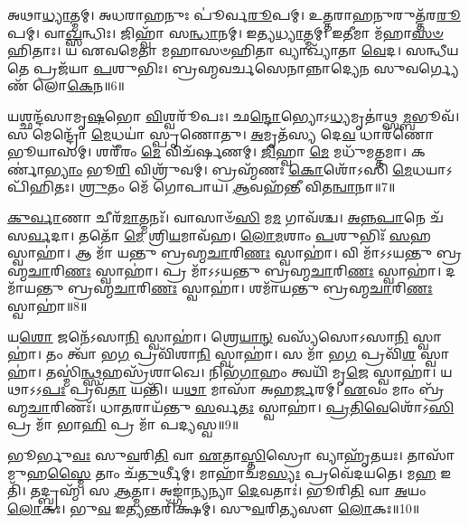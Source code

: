 𑌅𑌥𑌾\-\ul{𑌧𑍍𑌯𑌾}\-𑌤𑍍𑌮𑌮𑍍। 
𑌅𑌧𑌰𑌾𑌹𑌨𑍁𑌃 𑌪𑍂॑𑌰𑍍𑌵\-\-\ul{𑌰𑍂}\-𑌪𑌮𑍍। 
𑌉𑌤𑍍𑌤𑌰𑌾𑌹𑌨𑍁𑌰𑍁𑌤𑍍𑌤᳴𑌰\-\-\ul{𑌰𑍂}\-𑌪𑌮𑍍। 
𑌵𑌾\-\ul{𑌖𑍍𑌸}\-𑌨𑍍𑌧𑌿𑌃। 
𑌜𑌿𑌹𑍍𑌵𑌾᳴ 𑌸\-\ul{𑌨𑍍𑌧𑌾}\-𑌨𑌮𑍍। 
𑌇𑌤𑍍𑌯\-\ul{𑌧𑍍𑌯𑌾}\-𑌤𑍍𑌮𑌮𑍍। 
𑌇𑌤𑍀𑌮𑌾 𑌮᳴𑌹𑌾\-\-\ul{𑌸}\-\-\ul{𑍞}\-𑌹𑌿𑌤𑌾𑌃। 
𑌯 𑌏𑌵𑌮𑍇𑌤𑌾 𑌮𑌹𑌾\-𑌸𑍞𑌹𑌿𑌤𑌾 𑌵𑍍𑌯𑌾𑌖𑍍𑌯𑌾᳴𑌤𑌾 \ul{𑌵𑍇}\-𑌦। 
𑌸𑌨𑍍𑌧𑍀𑌯𑌤𑍇 𑌪𑍍𑌰𑌜᳴𑌯𑌾 \ul{𑌪}\-𑌶𑍁𑌭𑌿𑌃। 
𑌬𑍍𑌰𑌹𑍍𑌮𑌵𑌰𑍍𑌚𑌸𑍇𑌨𑌾𑌨𑍍𑌨𑌾𑌦𑍍𑌯𑍇𑌨 𑌸𑍁𑌵𑌰𑍍𑌗𑍍𑌯𑍇𑌣᳴ 𑌲𑍋\-\ul{𑌕𑍇}\-𑌨॥6॥
\anuvakamend[\-\ul{𑌸}\-𑌨𑍍𑌧𑌿𑌰𑌾𑌚𑌾𑌰𑍍𑌯𑌃 𑌪𑍂॑𑌰𑍍𑌵\-\ul{𑌰𑍂}\-𑌪𑌮𑌿𑌤𑍍𑌯\-\ul{𑌧𑌿}\-𑌪𑍍𑌰𑌜𑌂 𑌲𑍋᳴\-\ul{𑌕𑍇}\-𑌨]

𑌯𑌶𑍍𑌛𑌨𑍍𑌦᳴𑌸𑌾𑌮𑍃\-\ul{𑌷}\-𑌭𑍋 \ul{𑌵𑌿}\-𑌶𑍍𑌵𑌰𑍂᳴𑌪𑌃। 
𑌛\-\ul{𑌨𑍍𑌦𑍋}\-𑌭𑍍𑌯𑍋𑌽\-\ul{𑌧𑍍𑌯}\-𑌮𑍃𑌤𑌾॑𑌥𑍍𑌸\-\ul{𑌮𑍍𑌬}\-𑌭𑍂𑌵᳴। 
𑌸 𑌮𑍇𑌨𑍍𑌦𑍍𑌰𑍋᳴ \ul{𑌮𑍇}\-𑌧𑌯𑌾॑ 𑌸𑍍𑌪𑍃𑌣𑍋𑌤𑍁। 
\-\ul{𑌅}\-𑌮𑍃𑌤᳴𑌸𑍍𑌯 𑌦𑍇\-\ul{𑌵} 𑌧𑌾𑌰᳴𑌣𑍋 𑌭𑍂𑌯𑌾𑌸𑌮𑍍। 
𑌶𑌰𑍀᳴𑌰𑌂 \ul{𑌮𑍇} 𑌵𑌿𑌚᳴𑌰𑍍\mbox{}𑌷𑌣𑌮𑍍। 
\-\ul{𑌜𑌿}\-𑌹𑍍𑌵𑌾 \ul{𑌮𑍇} 𑌮𑌧𑍁᳴𑌮𑌤𑍍𑌤𑌮𑌾। 
𑌕𑌰𑍍𑌣𑌾॑\-\ul{𑌭𑍍𑌯𑌾𑌂} 𑌭𑍂\-\ul{𑌰𑌿} 𑌵𑌿𑌶𑍍𑌰𑍁᳴𑌵𑌮𑍍। 
𑌬𑍍𑌰𑌹𑍍𑌮᳴𑌣𑌃 \ul{𑌕𑍋}\-𑌶𑍋᳴𑌽𑌸𑌿 \ul{𑌮𑍇}\-𑌧𑌯𑌾𑌽𑌪𑌿᳴𑌹𑌿𑌤𑌃। 
\-\ul{𑌶𑍍𑌰𑍁}\-𑌤𑌂 𑌮𑍇᳴ 𑌗𑍋𑌪𑌾𑌯। 
\-\ul{𑌆}\-𑌵𑌹᳴𑌨𑍍𑌤𑍀 𑌵𑌿𑌤\-\ul{𑌨𑍍𑌵𑌾}\-𑌨𑌾॥7॥

\-\ul{𑌕𑍁}\-\-\ul{𑌰𑍍𑌵𑌾}\-𑌣𑌾 𑌚𑍀𑌰᳴\-\ul{𑌮𑌾}\-𑌤𑍍𑌮𑌨𑌃᳴। 
𑌵𑌾𑌸𑌾𑍞᳴\-\ul{𑌸𑌿} 𑌮\-\ul{𑌮} 𑌗𑌾𑌵᳴𑌶𑍍𑌚। 
\-\ul{𑌅}\-\-\ul{𑌨𑍍𑌨}\-\-\ul{𑌪𑌾}\-𑌨𑍇 𑌚᳴ 𑌸\-\ul{𑌰𑍍𑌵}\-𑌦𑌾। 
𑌤𑌤𑍋᳴ \ul{𑌮𑍇} 𑌶𑍍𑌰𑌿\-\ul{𑌯}\-𑌮𑌾𑌵᳴𑌹। 
\-\ul{𑌲𑍋}\-\-\ul{𑌮}\-𑌶𑌾𑌂 \ul{𑌪}\-𑌶𑍁𑌭𑌿𑌃᳴ \ul{𑌸}\-𑌹 𑌸𑍍𑌵𑌾𑌹𑌾॑। 
𑌆 𑌮𑌾᳴ 𑌯𑌨𑍍𑌤𑍁 𑌬𑍍𑌰𑌹𑍍𑌮\-\ul{𑌚𑌾}\-𑌰𑌿\-\ul{𑌣𑌃} 𑌸𑍍𑌵𑌾𑌹𑌾॑। 
𑌵𑌿 𑌮𑌾᳴𑌽𑌽𑌯𑌨𑍍𑌤𑍁 𑌬𑍍𑌰𑌹𑍍𑌮\-\ul{𑌚𑌾}\-𑌰𑌿\-\ul{𑌣𑌃} 𑌸𑍍𑌵𑌾𑌹𑌾॑। 
𑌪𑍍𑌰 𑌮𑌾᳴𑌽𑌽𑌯𑌨𑍍𑌤𑍁 𑌬𑍍𑌰𑌹𑍍𑌮\-\ul{𑌚𑌾}\-𑌰𑌿\-\ul{𑌣𑌃} 𑌸𑍍𑌵𑌾𑌹𑌾॑। 
𑌦𑌮𑌾᳴𑌯𑌨𑍍𑌤𑍁 𑌬𑍍𑌰𑌹𑍍𑌮\-\ul{𑌚𑌾}\-𑌰𑌿\-\ul{𑌣𑌃} 𑌸𑍍𑌵𑌾𑌹𑌾॑। 
𑌶𑌮𑌾᳴𑌯𑌨𑍍𑌤𑍁 𑌬𑍍𑌰𑌹𑍍𑌮\-\ul{𑌚𑌾}\-𑌰𑌿\-\ul{𑌣𑌃} 𑌸𑍍𑌵𑌾𑌹𑌾॑॥8॥

𑌯\-\ul{𑌶𑍋} 𑌜𑌨𑍇᳴𑌽𑌸𑌾\-\ul{𑌨𑌿} 𑌸𑍍𑌵𑌾𑌹𑌾॑। 
𑌶𑍍𑌰𑍇\-\ul{𑌯𑌾}\-\-\ul{𑌨𑍍} 𑌵𑌸𑍍𑌯᳴𑌸𑍋𑌽𑌸𑌾\-\ul{𑌨𑌿} 𑌸𑍍𑌵𑌾𑌹𑌾॑। 
𑌤𑌂 𑌤𑍍𑌵𑌾᳴ 𑌭\-\ul{𑌗} 𑌪𑍍𑌰𑌵𑌿᳴𑌶𑌾\-\ul{𑌨𑌿} 𑌸𑍍𑌵𑌾𑌹𑌾॑। 
𑌸 𑌮𑌾᳴ 𑌭\-\ul{𑌗} 𑌪𑍍𑌰𑌵𑌿᳴\-\ul{𑌶} 𑌸𑍍𑌵𑌾𑌹𑌾॑। 
𑌤𑌸𑍍𑌮𑌿॑\-\ul{𑌨𑍍𑌥𑍍𑌸}\-𑌹𑌸𑍍𑌰᳴𑌶𑌾𑌖𑍇। 
𑌨𑌿𑌭᳴\-\ul{𑌗𑌾}\-𑌹𑌂 𑌤𑍍𑌵𑌯𑌿᳴ 𑌮𑍃\-\ul{𑌜𑍇} 𑌸𑍍𑌵𑌾𑌹𑌾॑। 
𑌯𑌥𑌾𑌽𑌽\-\ul{𑌪𑌃} 𑌪𑍍𑌰𑌵᳴\-\ul{𑌤𑌾} 𑌯𑌨𑍍𑌤𑌿᳴। 
𑌯\-\ul{𑌥𑌾} 𑌮𑌾𑌸𑌾᳴ 𑌅𑌹\-\ul{𑌰𑍍𑌜}\-𑌰𑌮𑍍। 
\-\ul{𑌏}\-𑌵𑌂 𑌮𑌾𑌂 𑌬𑍍𑌰᳴𑌹𑍍𑌮\-\ul{𑌚𑌾}\-𑌰𑌿𑌣𑌃᳴। 
𑌧𑌾\-\ul{𑌤}\-𑌰𑌾𑌯᳴𑌨𑍍𑌤𑍁 \ul{𑌸}\-𑌰𑍍𑌵\-\ul{𑌤𑌃} 𑌸𑍍𑌵𑌾𑌹𑌾॑। 
\-\ul{𑌪𑍍𑌰}\-\-\ul{𑌤𑌿}\-\-\ul{𑌵𑍇}\-𑌶𑍋᳴𑌽\-\ul{𑌸𑌿} 𑌪𑍍𑌰 𑌮𑌾᳴ 𑌭𑌾\-\ul{𑌹𑌿} 𑌪𑍍𑌰 𑌮𑌾᳴ 𑌪𑌦𑍍𑌯𑌸𑍍𑌵॥9॥
\anuvakamend%

𑌭𑍂𑌰𑍍𑌭𑍁\-\ul{𑌵𑌃} 𑌸𑍁\-\ul{𑌵}\-𑌰𑌿\-\ul{𑌤𑌿} 𑌵𑌾 \ul{𑌏}\-𑌤𑌾\-\ul{𑌸𑍍𑌤𑌿}\-𑌸𑍍𑌰𑍋 𑌵𑍍𑌯𑌾𑌹𑍃᳴𑌤𑌯𑌃। 
𑌤𑌾𑌸𑌾᳴𑌮𑍁𑌹\-\ul{𑌸𑍍𑌮𑍈} 𑌤𑌾𑌂 𑌚᳴\-\ul{𑌤𑍁}\-𑌰𑍍𑌥𑍀𑌮𑍍। 
𑌮𑌾𑌹𑌾᳴𑌚𑌮\-\ul{𑌸𑍍𑌯𑌃} 𑌪𑍍𑌰𑌵𑍇᳴𑌦𑌯𑌤𑍇। 
𑌮\-\ul{𑌹} 𑌇𑌤𑌿᳴। 
𑌤𑌦𑍍𑌬𑍍𑌰𑌹𑍍𑌮᳴। 
𑌸 \ul{𑌆}\-𑌤𑍍𑌮𑌾। 
𑌅𑌙𑍍𑌗𑌾॑\-\ul{𑌨𑍍𑌯}\-𑌨𑍍𑌯𑌾 \ul{𑌦𑍇}\-𑌵𑌤𑌾𑌃॑। 
𑌭𑍂𑌰𑌿\-\ul{𑌤𑌿} 𑌵𑌾 \ul{𑌅}\-𑌯𑌂 \ul{𑌲𑍋}\-𑌕𑌃। 
𑌭𑍁\-\ul{𑌵} 𑌇\-\ul{𑌤𑍍𑌯}\-𑌨𑍍𑌤𑌰𑌿᳴𑌕𑍍𑌷𑌮𑍍। 
𑌸𑍁\-\ul{𑌵}\-𑌰𑌿\-\ul{𑌤𑍍𑌯}\-𑌸𑍗 \ul{𑌲𑍋}\-𑌕𑌃॥10॥

